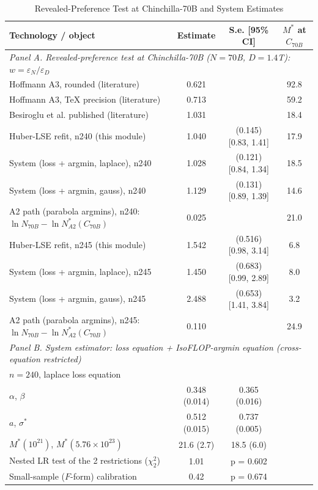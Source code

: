 \begin{table}[!htbp]
\centering
\scriptsize
\caption{Revealed-Preference Test at Chinchilla-70B and System Estimates}
\label{tab:m1_revealed_system}
\begin{threeparttable}
\begin{tabular}{lccc}
\toprule
Technology / object & Estimate & S.e. [95\% CI] & $M^*$ at $C_{70B}$ \\
\midrule
\multicolumn{4}{l}{\textit{Panel A. Revealed-preference test at Chinchilla-70B ($N=70$B, $D=1.4$T): $w=\varepsilon_N/\varepsilon_D$}} \\
Hoffmann A3, rounded (literature) & 0.621 &   & 92.8 \\
Hoffmann A3, TeX precision (literature) & 0.713 &   & 59.2 \\
Besiroglu et al. published (literature) & 1.031 &   & 18.4 \\
Huber-LSE refit, n240 (this module) & 1.040 & (0.145) [0.83, 1.41] & 17.9 \\
System (loss + argmin, laplace), n240 & 1.028 & (0.121) [0.84, 1.34] & 18.5 \\
System (loss + argmin, gauss), n240 & 1.129 & (0.131) [0.89, 1.39] & 14.6 \\
A2 path (parabola argmins), n240: $\ln N_{70B}-\ln N^*_{A2}(C_{70B})$ & 0.025 &  & 21.0 \\
Huber-LSE refit, n245 (this module) & 1.542 & (0.516) [0.98, 3.14] & 6.8 \\
System (loss + argmin, laplace), n245 & 1.450 & (0.683) [0.99, 2.89] & 8.0 \\
System (loss + argmin, gauss), n245 & 2.488 & (0.653) [1.41, 3.84] & 3.2 \\
A2 path (parabola argmins), n245: $\ln N_{70B}-\ln N^*_{A2}(C_{70B})$ & 0.110 &  & 24.9 \\
\multicolumn{4}{l}{\textit{Panel B. System estimator: loss equation + IsoFLOP-argmin equation (cross-equation restricted)}} \\
$n=240$, laplace loss equation &  &  &  \\
\quad $\alpha$, $\beta$ & 0.348 (0.014) & 0.365 (0.016) &  \\
\quad $a$, $\sigma^*$ & 0.512 (0.015) & 0.737 (0.005) &  \\
\quad $M^*(10^{21})$, $M^*(5.76\times10^{23})$ & 21.6 (2.7) & 18.5 (6.0) &  \\
\quad Nested LR test of the 2 restrictions ($\chi^2_2$) & 1.01 & p = 0.602 &  \\
\quad Small-sample ($F$-form) calibration & 0.42 & p = 0.674 &  \\

\end{tabular}
\end{threeparttable}
\end{table}
